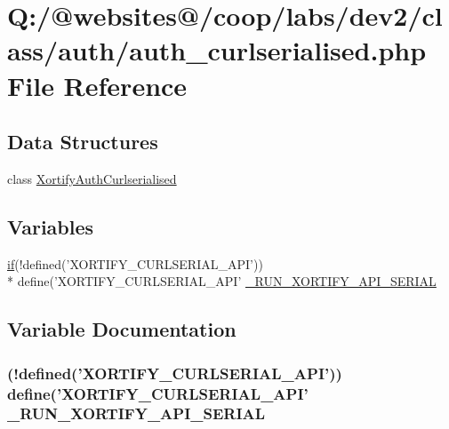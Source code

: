 \hypertarget{auth__curlserialised_8php}{\section{Q\-:/@websites@/coop/labs/dev2/class/auth/auth\-\_\-curlserialised.php File Reference}
\label{auth__curlserialised_8php}
}
\subsection*{Data Structures}
\begin{DoxyCompactItemize}
\item 
class \hyperlink{class_xortify_auth_curlserialised}{Xortify\-Auth\-Curlserialised}
\end{DoxyCompactItemize}
\subsection*{Variables}
\begin{DoxyCompactItemize}
\item 
\hyperlink{index_8php_ae2ccdf355624402b65fc2226f2a661cd}{if}(!defined('X\-O\-R\-T\-I\-F\-Y\-\_\-\-C\-U\-R\-L\-S\-E\-R\-I\-A\-L\-\_\-\-A\-P\-I')) \\*
define('X\-O\-R\-T\-I\-F\-Y\-\_\-\-C\-U\-R\-L\-S\-E\-R\-I\-A\-L\-\_\-\-A\-P\-I' \hyperlink{auth__curlserialised_8php_ad5a866cc5b2cee888bed49be72647aca}{\-\_\-\-R\-U\-N\-\_\-\-X\-O\-R\-T\-I\-F\-Y\-\_\-\-A\-P\-I\-\_\-\-S\-E\-R\-I\-A\-L}
\end{DoxyCompactItemize}


\subsection{Variable Documentation}
\hypertarget{auth__curlserialised_8php_ad5a866cc5b2cee888bed49be72647aca}{
\subsubsection[{\-\_\-\-R\-U\-N\-\_\-\-X\-O\-R\-T\-I\-F\-Y\-\_\-\-A\-P\-I\-\_\-\-S\-E\-R\-I\-A\-L}]{ (!defined('X\-O\-R\-T\-I\-F\-Y\-\_\-\-C\-U\-R\-L\-S\-E\-R\-I\-A\-L\-\_\-\-A\-P\-I')) define('X\-O\-R\-T\-I\-F\-Y\-\_\-\-C\-U\-R\-L\-S\-E\-R\-I\-A\-L\-\_\-\-A\-P\-I' \-\_\-\-R\-U\-N\-\_\-\-X\-O\-R\-T\-I\-F\-Y\-\_\-\-A\-P\-I\-\_\-\-S\-E\-R\-I\-A\-L}}\label{auth__curlserialised_8php_ad5a866cc5b2cee888bed49be72647aca}

